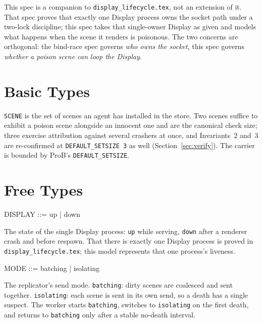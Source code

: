 \documentclass[a4paper,10pt,fleqn]{article}
\begin{document}
This spec is a companion to \texttt{display\_lifecycle.tex}, not an extension of
it.  That spec proves that exactly one Display process owns the socket path under
a two-lock discipline; this spec takes that single-owner Display as given and
models what happens when the scene it renders is poisonous.  The two concerns are
orthogonal: the bind-race spec governs \emph{who owns the socket}, this spec
governs \emph{whether a poison scene can loop the Display}.

\section{Basic Types}

\begin{zed}
  [SCENE]
\end{zed}

\texttt{SCENE} is the set of scenes an agent has installed in the store.  Two
scenes suffice to exhibit a poison scene alongside an innocent one and are the
canonical check size; three exercise attribution against several crashers at once,
and Invariants~2 and~3 are re-confirmed at \texttt{DEFAULT\_SETSIZE 3} as well
(Section~\ref{sec:verify}).  The carrier is bounded by ProB's
\texttt{DEFAULT\_SETSIZE}.

\section{Free Types}

\begin{zed}
  DISPLAY ::= up | down
\end{zed}

The state of the single Display process: \texttt{up} while serving,
\texttt{down} after a renderer crash and before respawn.  That there is exactly
one Display process is proved in \texttt{display\_lifecycle.tex}; this model
represents that one process's liveness.

\begin{zed}
  MODE ::= batching | isolating
\end{zed}

The replicator's send mode.  \texttt{batching}: dirty scenes are coalesced and
sent together.  \texttt{isolating}: each scene is sent in its own send, so a
death has a single suspect.  The worker starts \texttt{batching}, switches to
\texttt{isolating} on the first death, and returns to \texttt{batching} only
after a stable no-death interval.
\end{document}
